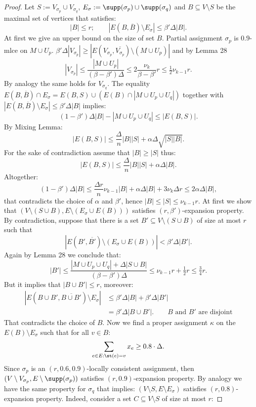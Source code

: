 \begin{proof}
Let $S:=V_{\sigma_p}\cup V_{\sigma_q}$, $E_\sigma:=\supp(\sigma_p)\cup\supp(\sigma_q)$ and $B\subseteq V\setminus S$ be the maximal set of vertices that satisfies:
\[|B|\le r;\qquad |E(B,\overline B)\setminus E_\sigma|\le\beta'\Delta|B|.\]
At first we give an upper bound on the size of set $B$.
Partial assignment $\sigma_p$ is $0.9$-mlce on $M\cup U_p$. $\beta'\Delta|V_{\sigma_p}|\ge|E(V_{\sigma_p},\overline{V_{\sigma_p}})\setminus(M\cup U_p)|$ and by Lemma 28
\[|V_{\sigma_p}|\le\frac{|M\cup U_p|}{(\beta-\beta')\Delta}\le2\frac{\nu_k}{\beta-\beta'}r\le\tfrac12\nu_{k-1}r.\]
By analogy the same holds for $V_{\sigma_q}$.
The equality $E(B,\overline B)\cap E_\sigma=E(B,S)\cup(E(B)\cap|M\cup U_p\cup U_q|)$ together with $|E(B,\overline B)\setminus E_\sigma|\le\beta'\Delta|B|$ implies:
\[(1-\beta')\Delta|B|-|M\cup U_p\cup U_q|\le|E(B,S)|.\]
By Mixing Lemma:
\[|E(B,S)|\le\frac\Delta n|B||S|+\alpha\Delta\sqrt{|S||B|}.\]
For the sake of contradiction assume that $|B|\ge|S|$ thus:
\[|E(B,S)|\le\frac\Delta n|B||S|+\alpha\Delta|B|.\]
Altogether:
\[(1-\beta')\Delta|B|\le\frac{\Delta r}{n}\nu_{k-1}|B|+\alpha\Delta|B|+3\nu_k\Delta r\le2\alpha\Delta|B|,\]
that contradicts the choice of $\alpha$ and $\beta'$, hence $|B|\le|S|\le\nu_{k-1}r$.
At first we show that $(V\setminus(S\cup B),E\setminus(E_\sigma\cup E(B)))$ satisfies $(r,\beta')$-expansion property. By contradiction, suppose that there is a set $B'\subseteq V\setminus(S\cup B)$ of size at most $r$ such that
\[|E(B',\overline{B'})\setminus(E_\sigma\cup E(B))|<\beta'\Delta|B'|.\]
Again by Lemma 28 we conclude that:
\[|B'|\le\frac{|M\cup U_p\cup U_q|+\Delta|S\cup B|}{(\beta-\beta')\Delta}\le\nu_{k-1}r+\tfrac12r\le\tfrac34r.\]
But it implies that $|B\cup B'|\le r$, moreover:
\begin{align*}
|E(B\cup B',\overline{B\cup B'})\setminus E_\sigma|&\le\beta'\Delta|B|+\beta'\Delta|B'|\\
&=\beta'\Delta|B\cup B'|.\qquad\text{$B$ and $B'$ are disjoint}
\end{align*}
That contradicts the choice of $B$.
Now we find a proper assignment $\kappa$ on the $E(B)\setminus E_\sigma$ such that for all $v\in B$:
\[\sum_{e\in E:\st(e)=v}x_e\ge0.8\cdot\Delta.\]
Since $\sigma_p$ is an $(r,0.6,0.9)$-locally consistent assignment, then $(V\setminus V_{\sigma_p},E\setminus\supp(\sigma_p))$ satisfies $(r,0.9)$-expansion property. By analogy we have the same property for $\sigma_q$ that implies: $(V\setminus S,E\setminus E_\sigma)$ satisfies $(r,0.8)$-expansion property. Indeed, consider a set $C\subseteq V\setminus S$ of size at most $r$:

\end{proof}
